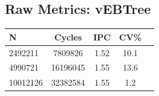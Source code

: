 \subsection*{Raw Metrics: vEBTree}
\begin{table}[H]
\centering
{}
\begin{tabular}{@{}lcccc@{}}
\toprule
\rowcolor{teal!20} N & Cycles & IPC & CV\% \\ \midrule
2492211 & 7809826 & 1.52 & 10.1 \\ 
4990721 & 16196045 & 1.55 & 13.6 \\ 
10012126 & 32382584 & 1.55 & 1.2 \\ 
\bottomrule
\end{tabular}
\end{table}

\clearpage
